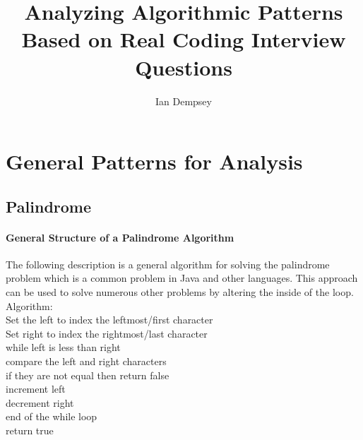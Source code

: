 \documentclass[twocolumn]{article}
\title{Analyzing Algorithmic Patterns Based on Real Coding Interview Questions}
\author{Ian Dempsey}
\begin{document}
\maketitle
{}

\newpage
{}

\section{General Patterns for Analysis}
\subsection{Palindrome}
\paragraph{General Structure of a Palindrome Algorithm}
The following description is a general algorithm for solving the palindrome problem which is a common problem in Java and other languages. This approach can be used to solve numerous other problems by altering the inside of the loop.\\
Algorithm:\\
Set the left to index the leftmost/first character\\
Set right to index the rightmost/last character\\
while left is less than right\\
\hspace*{0.5in}	compare the left and right characters\\
\hspace*{0.5in}	if they are not equal then return false\\
\hspace*{0.5in}	increment left\\
\hspace*{0.5in}	decrement right\\
end of the while loop\\
return true 
\end{document}
